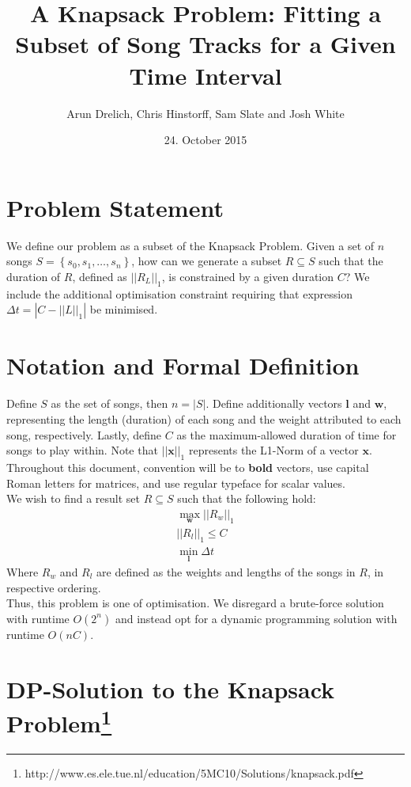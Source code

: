 \documentclass[11pt]{article}
\title{\textbf{A Knapsack Problem: Fitting a Subset of Song Tracks for a Given Time Interval}}
\author{Arun Drelich, Chris Hinstorff, Sam Slate and Josh White}
\date{24. October 2015}
\begin{document}
\maketitle

\section*{Problem Statement}

We define our problem as a subset of the Knapsack Problem. Given a set of $n$ songs $S = \left\{ {s_0, s_1, \ldots, s_n} \right\}$, how can we generate a subset $R \subseteq S$ such that the duration of $R$, defined as $||R_{L}||_{1}$, is constrained by a given duration $C$? We include the additional optimisation constraint requiring that expression $\Delta t = |C - {||L||}_{1}|$ be minimised.

\section*{Notation and Formal Definition}

Define $S$ as the set of songs, then $n = |S|$. Define additionally vectors $\mathbf{l}$ and $\mathbf{w}$, representing the length (duration) of each song and the weight attributed to each song, respectively. Lastly, define $C$ as the maximum-allowed duration of time for songs to play within. Note that $||\mathbf{x}||_{1}$ represents the L1-Norm of a vector $\mathbf{x}$. Throughout this document, convention will be to \textbf{bold} vectors, use capital Roman letters for matrices, and use regular typeface for scalar values. \\
We wish to find a result set $R \subseteq S$ such that the following hold:
\begin{gather}
  \max_{\mathbf{w}} {||R_{w}||_{1}} \\
  ||R_{l}||_{1} \leq C \\
  \min_{\mathbf{l}} {\Delta t}
\end{gather}
Where $R_{w}$ and $R_{l}$ are defined as the weights and lengths of the songs in $R$, in respective ordering. \\
Thus, this problem is one of optimisation. We disregard a brute-force solution with runtime $O(2^n)$ and instead opt for a dynamic programming solution with runtime $O(nC)$.

\section*{DP-Solution to the Knapsack Problem\footnote{http://www.es.ele.tue.nl/education/5MC10/Solutions/knapsack.pdf}}
\end{document}
